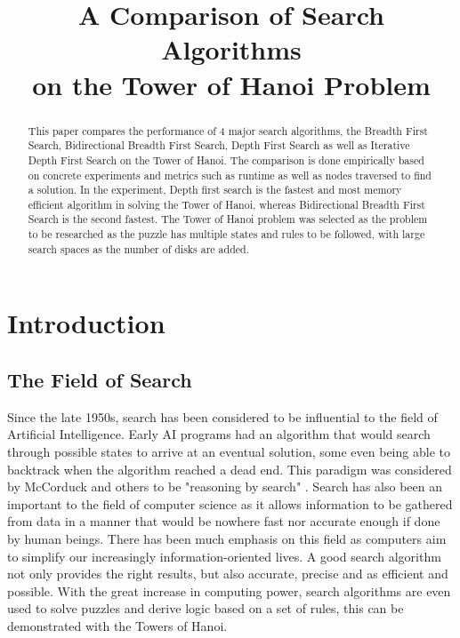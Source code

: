 \documentclass[conference]{IEEEtran}
\begin{document}
\title{A Comparison of Search Algorithms\\ on the Tower of Hanoi Problem  }

\author{
}
\maketitle

\begin{abstract}
This paper compares the performance of 4 major search algorithms, the Breadth First Search, Bidirectional Breadth First Search, Depth First Search as well as Iterative Depth First Search on the Tower of Hanoi. The comparison is done empirically based on concrete experiments and metrics such as runtime as well as nodes traversed to find a solution. In the experiment, Depth first search is the fastest and most memory efficient algorithm in solving the Tower of Hanoi, whereas Bidirectional Breadth First Search is the second fastest. The Tower of Hanoi problem was selected as the problem to be researched as the puzzle has multiple states and rules to be followed, with large search spaces as the number of disks are added.

\end{abstract}

\section{Introduction}

\subsection{The Field of Search}
Since the late 1950s, search has been considered to be influential to the field of Artificial Intelligence. Early AI programs had an algorithm that would search through possible states to arrive at an eventual solution, some even being able to backtrack when the algorithm reached a dead end. This paradigm was considered by McCorduck and others to be "reasoning by search" \cite{McCorduck01}. Search has also been an important to the field of computer science as it allows information to be gathered from data in a manner that would be nowhere fast nor accurate enough if done by human beings. There has been much emphasis on this field as computers aim to simplify our increasingly information-oriented lives. A good search algorithm not only provides the right results, but also accurate, precise and as efficient and possible. With the great increase in computing power, search algorithms are even used to solve puzzles and derive logic based on a set of rules, this can be demonstrated with the Towers of Hanoi.
\end{document}
